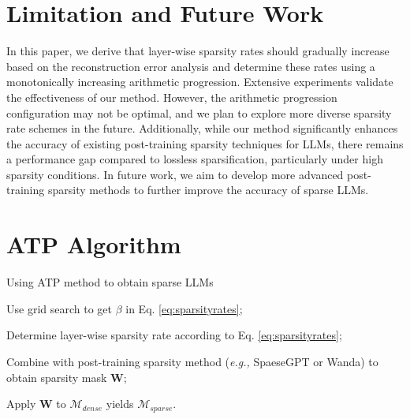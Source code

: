 \section{Limitation and Future Work}
In this paper, we derive that layer-wise sparsity rates should gradually increase based on the reconstruction error analysis and determine these rates using a monotonically increasing arithmetic progression. Extensive experiments validate the effectiveness of our method. However, the arithmetic progression configuration may not be optimal, and we plan to explore more diverse sparsity rate schemes in the future. Additionally, while our method significantly enhances the accuracy of existing post-training sparsity techniques for LLMs, there remains a performance gap compared to lossless sparsification, particularly under high sparsity conditions. In future work, we aim to develop more advanced post-training sparsity methods to further improve the accuracy of sparse LLMs.

\section{ATP Algorithm}
\begin{algorithm}[H]
\caption{Using ATP method to obtain sparse LLMs}
\label{alg}
Use grid search to get $\beta$ in Eq. \ref{eq:sparsityrates};

Determine layer-wise sparsity rate according to Eq. \ref{eq:sparsityrates};

Combine with post-training sparsity method (\emph{e.g.,} SpaeseGPT or Wanda) to obtain sparsity mask $\mathbf{W}$;

Apply $\mathbf{W}$ to $\mathcal{M}_{dense}$ yields $\mathcal{M}_{sparse}$.
\end{algorithm}


